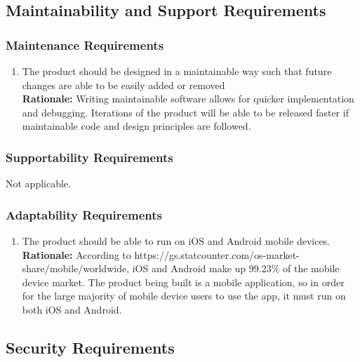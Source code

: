 \documentclass[]{article}
\begin{document}

\subsection{Maintainability and Support Requirements}
\label{sub:maintainability_and_support_requirements}

\subsubsection{Maintenance Requirements}
\label{ssub:maintenance_requirements}
\begin{enumerate}[{MS-M}1. ]
	\item The product should be designed in a maintainable way such that future changes are able to be easily added or removed \\
	{\bf Rationale:} Writing maintainable software allows for quicker implementation and debugging. Iterations of the product will be able to be released faster if maintainable code and design principles are followed.
\end{enumerate}

\subsubsection{Supportability Requirements}
\label{ssub:supportability_requirements}
Not applicable.

\subsubsection{Adaptability Requirements}
\label{ssub:adaptability_requirements}
\begin{enumerate}[{MS-A}1. ]
	\item The product should be able to run on iOS and Android mobile devices. \\
	{\bf Rationale:} According to https://gs.statcounter.com/os-market-share/mobile/worldwide, iOS and Android make up 99.23\% of the mobile device market. The product being built is a mobile application, so in order for the large majority of mobile device users to use the app, it must run on both iOS and Android.
\end{enumerate}


\subsection{Security Requirements}
\label{sub:security_requirements}
\end{document}

